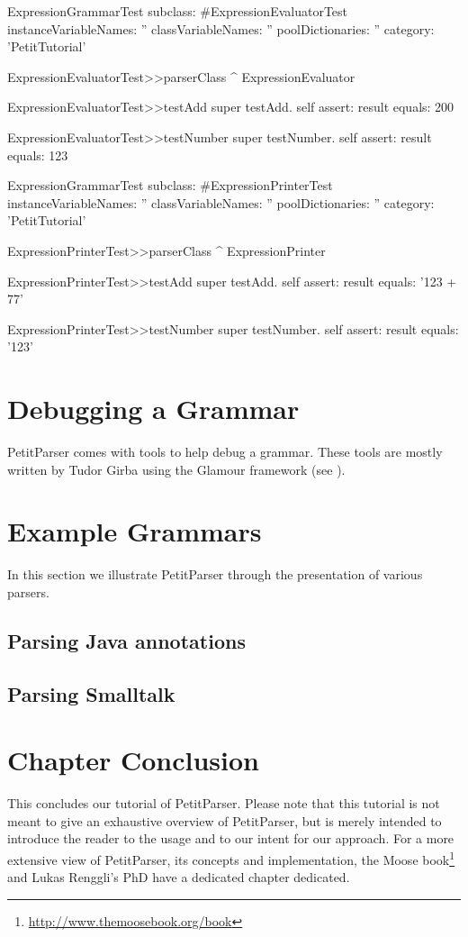 \documentclass[a4paper,10pt,twoside]{book}
\begin{document}
\begin{code}{}
ExpressionGrammarTest subclass: #ExpressionEvaluatorTest
  instanceVariableNames: ''
  classVariableNames: ''
  poolDictionaries: ''
  category: 'PetitTutorial'

ExpressionEvaluatorTest>>parserClass
  ^ ExpressionEvaluator 

ExpressionEvaluatorTest>>testAdd
  super testAdd.
  self assert: result equals: 200

ExpressionEvaluatorTest>>testNumber
  super testNumber.
  self assert: result equals: 123

ExpressionGrammarTest subclass: #ExpressionPrinterTest
  instanceVariableNames: ''
  classVariableNames: ''
  poolDictionaries: ''
  category: 'PetitTutorial'

ExpressionPrinterTest>>parserClass
  ^ ExpressionPrinter 

ExpressionPrinterTest>>testAdd
  super testAdd.
  self assert: result equals: '123 + 77'

ExpressionPrinterTest>>testNumber
  super testNumber.
  self assert: result equals: '123'
\end{code}

\section{Debugging a Grammar}

PetitParser comes with tools to help debug a grammar. These tools are
mostly written by Tudor Girba using the Glamour framework (see
).

\section{Example Grammars}

In this section we illustrate PetitParser through the presentation of
various parsers.

\subsection{Parsing Java annotations}


\subsection{Parsing Smalltalk}

\section{Chapter Conclusion}

This concludes our tutorial of PetitParser. Please note that this
tutorial is not meant to give an exhaustive overview of PetitParser,
but is merely intended to introduce the reader to the usage and to our
intent for our approach. For a more extensive view of PetitParser, its
concepts and implementation, the Moose
book\footnote{\url{http://www.themoosebook.org/book}} and Lukas
Renggli's PhD have a dedicated chapter dedicated.

\ifx\wholebook\relax\else
   
   
\end{document}
